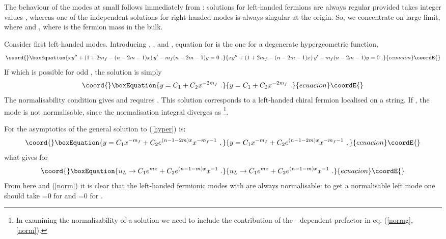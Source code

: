 \documentclass[a4paper,12pt]{article}
\begin{document}
The behaviour of the modes at small \coordHE{} follows immediately from
\cite{Jackiw:1981ee}: solutions for left-handed fermions are always
regular provided \coordHE{} takes integer values \coordHE{}, whereas
one of the independent solutions for right-handed modes is always
singular at the origin. So, we concentrate on large \coordHE{} limit, where
\coordHE{} and \coordHE{}, where \coordHE{} is the fermion mass in the
bulk. 

Consider first left-handed modes. Introducing \coordHE{},
\coordHE{}, and \coordHE{}, equation for \coordHE{} is
the one for a degenerate hypergeometric function,
\begin{equation}\coord{}\boxEquation{
xy'' +\left(1+2m_f -(n-2m-1)x\right)y' -m_f(n-2m-1)y=0~.
\label{hyper}
}{
xy'' +\left(1+2m_f -(n-2m-1)x\right)y' -m_f(n-2m-1)y=0~.
}{ecuacion}\coordE{}\end{equation}
If \coordHE{} which is possible for odd \coordHE{}, the solution is
simply
\begin{equation}\coord{}\boxEquation{
y=C_1+C_2x^{-2m_f}~.
}{
y=C_1+C_2x^{-2m_f}~.
}{ecuacion}\coordE{}\end{equation}
The normalisability condition gives \coordHE{} and requires \coordHE{}. This solution corresponds to a left-handed chiral fermion
localised on a string. If \coordHE{}, the mode is not normalisable,
since the normalisation integral diverges as \coordHE{}\footnote{In
examining the normalisability of a solution we need to include the
contribution of the \coordHE{}- dependent prefactor in eq.
(\ref{normg},\ref{norm}).}.

For \coordHE{} the \coordHE{} asymptotics of the 
general solution to (\ref{hyper}) is:
\begin{equation}\coord{}\boxEquation{
y=C_1 x^{-m_f}+C_2 e^{(n-1-2m)x}x^{-m_f-1}~,
}{
y=C_1 x^{-m_f}+C_2 e^{(n-1-2m)x}x^{-m_f-1}~,
}{ecuacion}\coordE{}\end{equation}
what gives for \coordHE{}
\begin{equation}\coord{}\boxEquation{
u_{L} \to C_1 e^{mx} + C_2 e^{(n-1-m)x}x^{-1}~.
\label{ulsol}
}{
u_{L} \to C_1 e^{mx} + C_2 e^{(n-1-m)x}x^{-1}~.
}{ecuacion}\coordE{}\end{equation}
From here and (\ref{norm}) it is clear that the left-handed fermionic
modes with \coordHE{} are always normalisable: to get a
normalisable left mode one should take \coordHE{}=0 for \coordHE{}
and  \coordHE{}=0 for \coordHE{}. 
\end{document}
